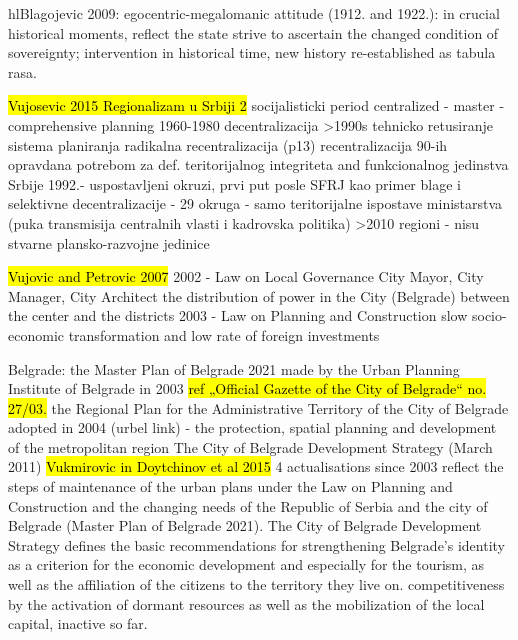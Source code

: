 \documentclass[11pt]{report}
\begin{document}
hl{Blagojevic 2009}: 
egocentric-megalomanic attitude (1912. and 1922.): in crucial historical moments, reflect the state strive to ascertain the changed condition of sovereignty; intervention in historical time, new history re-established as tabula rasa.

\hl{Vujosevic 2015 Regionalizam u Srbiji 2}
	socijalisticki period 
centralized - master - comprehensive planning
1960-1980 decentralizacija
    >1990s
tehnicko retusiranje sistema planiranja
radikalna recentralizacija (p13)
recentralizacija 90-ih opravdana potrebom za def. teritorijalnog integriteta and funkcionalnog jedinstva Srbije
1992.- uspostavljeni okruzi, prvi put posle SFRJ kao primer blage i selektivne decentralizacije - 29 okruga - samo teritorijalne ispostave ministarstva (puka transmisija centralnih vlasti i kadrovska politika)
	    >2010
regioni - nisu stvarne plansko-razvojne jedinice 

\hl{Vujovic and Petrovic 2007}
2002 - Law on Local Governance
City Mayor, City Manager, City Architect
the distribution of power in the City (Belgrade) between the center and the districts
2003 - Law on Planning and Construction
slow socio-economic transformation and low rate of foreign investments

Belgrade:
the Master Plan of Belgrade 2021  made  by  the  Urban  Planning  Institute  of  Belgrade  in  2003 \hl{ref „Official Gazette of the City of Belgrade“ no. 27/03.} 
the  Regional  Plan  for  the  Administrative  Territory  of  the  City of Belgrade adopted in 2004 (urbel link) - the protection, spatial planning and development of the metropolitan region
The City of Belgrade Development Strategy (March 2011)
\hl{Vukmirovic in Doytchinov et al 2015}
4 actualisations  since  2003  reflect  the  steps  of  maintenance  of  the  urban plans  under  the  Law  on  Planning  and  Construction  and  the  changing  needs of the Republic of Serbia and the city of Belgrade (Master Plan of Belgrade 2021).
The City of Belgrade Development Strategy defines the basic recommendations for strengthening Belgrade’s identity as a criterion for the economic development and especially for the tourism, as well as the affiliation of the citizens to the territory they live on. 
competitiveness by  the activation of dormant resources as well 
as the mobilization of the local capital, inactive so far.
\end{document}

